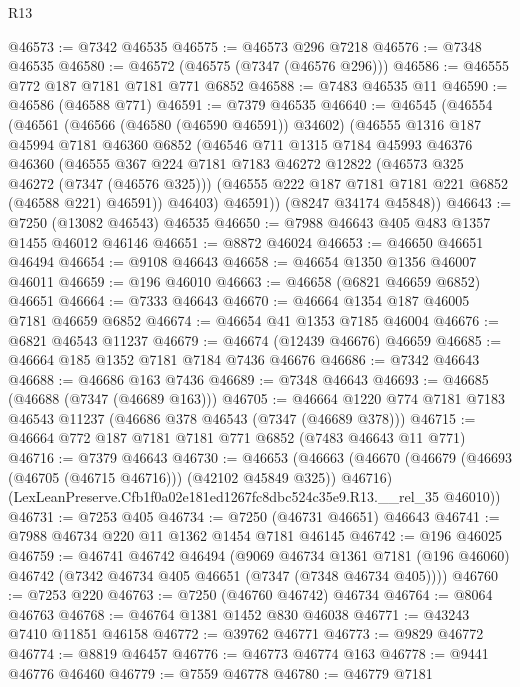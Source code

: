 \begin{lexlean}{R13}
\begin{coremodule}
@46573 := @7342 @46535
@46575 := @46573 @296 @7218
@46576 := @7348 @46535
@46580 := @46572 (@46575 (@7347 (@46576 @296)))
@46586 := @46555 @772 @187 @7181 @7181 @771 @6852
@46588 := @7483 @46535 @11
@46590 := @46586 (@46588 @771)
@46591 := @7379 @46535
@46640 := @46545
    (@46554
      (@46561
        (@46566 (@46580 (@46590 @46591)) @34602)
        (@46555
          @1316
          @187
          @45994
          @7181
          @46360
          @6852
          (@46546
            @711
            @1315
            @7184
            @45993
            @46376
            @46360
            (@46555
              @367
              @224
              @7181
              @7183
              @46272
              @12822
              (@46573 @325 @46272 (@7347 (@46576 @325)))
              (@46555 @222 @187 @7181 @7181 @221 @6852 (@46588 @221) @46591))
            @46403)
          @46591))
      (@8247 @34174 @45848))
@46643 := @7250 (@13082 @46543) @46535
@46650 := @7988 @46643 @405 @483 @1357 @1455 @46012 @46146
@46651 := @8872 @46024
@46653 := @46650 @46651 @46494
@46654 := @9108 @46643
@46658 := @46654 @1350 @1356 @46007 @46011
@46659 := @196 @46010
@46663 := @46658 (@6821 @46659 @6852) @46651
@46664 := @7333 @46643
@46670 := @46664 @1354 @187 @46005 @7181 @46659 @6852
@46674 := @46654 @41 @1353 @7185 @46004
@46676 := @6821 @46543 @11237
@46679 := @46674 (@12439 @46676) @46659
@46685 := @46664 @185 @1352 @7181 @7184 @7436 @46676
@46686 := @7342 @46643
@46688 := @46686 @163 @7436
@46689 := @7348 @46643
@46693 := @46685 (@46688 (@7347 (@46689 @163)))
@46705 := @46664 @1220 @774 @7181 @7183 @46543 @11237 (@46686 @378 @46543 (@7347 (@46689 @378)))
@46715 := @46664 @772 @187 @7181 @7181 @771 @6852 (@7483 @46643 @11 @771)
@46716 := @7379 @46643
@46730 := @46653
    (@46663
      (@46670 (@46679 (@46693 (@46705 (@46715 @46716))) (@42102 @45849 @325)) @46716)
      (LexLeanPreserve.Cfb1f0a02e181ed1267fc8dbc524c35e9.R13.__rel_35 @46010))
@46731 := @7253 @405
@46734 := @7250 (@46731 @46651) @46643
@46741 := @7988 @46734 @220 @11 @1362 @1454 @7181 @46145
@46742 := @196 @46025
@46759 := @46741
    @46742
    @46494
    (@9069
      @46734
      @1361
      @7181
      (@196 @46060)
      @46742
      (@7342 @46734 @405 @46651 (@7347 (@7348 @46734 @405))))
@46760 := @7253 @220
@46763 := @7250 (@46760 @46742) @46734
@46764 := @8064 @46763
@46768 := @46764 @1381 @1452 @830 @46038
@46771 := @43243 @7410 @11851 @46158
@46772 := @39762 @46771
@46773 := @9829 @46772
@46774 := @8819 @46457
@46776 := @46773 @46774 @163
@46778 := @9441 @46776 @46460
@46779 := @7559 @46778
@46780 := @46779 @7181

\end{coremodule}
\end{lexlean}
